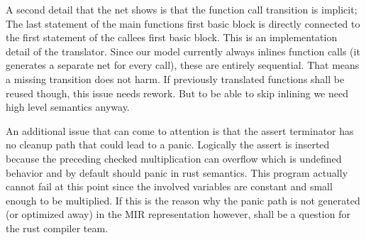 A second detail that the net shows is that the function call transition is implicit;
The last statement of the main functions first basic block is directly connected to the first statement of the callees first basic block.
This is an implementation detail of the translator.
Since our model currently always inlines function calls (it generates a separate net for every call), these are entirely sequential.
That means a missing transition does not harm.
If previously translated functions shall be reused though, this issue needs rework.
But to be able to skip inlining we need high level semantics anyway.

An additional issue that can come to attention is that the assert terminator has no cleanup path that could lead to a panic.
Logically the assert is inserted because the preceding checked multiplication can overflow which is undefined behavior and by default should panic in rust semantics.
This program actually cannot fail at this point since the involved variables are constant and small enough to be multiplied.
If this is the reason why the panic path is not generated (or optimized away) in the MIR representation however, shall be a question for the rust compiler team.


